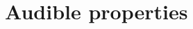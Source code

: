 \documentclass{amsart}
\begin{document}
\begin{comment}
Now suppose that $C$ is invertible (so that, in particular, $p_\lambda(0) \neq
	0$) and set $A = C^\inv$. Then the formula
\begin{equation}
	\label{eq:dlog}
	\frac{d}{d\lambda} \log \det (\id - \lambda C) = -\Tr R_\lambda (A)
\end{equation}
holds. When $R_\lambda(A)$ is an integral operator acting on some space $H =
	L^2(X)$ via an integral kernel $R_\lambda (x,y)$ on $X\times X$, the trace may be
computed via
\begin{equation}
	\label{eq:trace}
	\Tr R_\lambda (A) = \int_X R_\lambda (x,x) \dop x.
\end{equation}
\subsection{Storing spectral data}
Now let $M$ be a compact connected, Riemannian manifold without boundary. Let
$\Delta$ be the laplace-beltrami operator on $M$. Its resolvent
$R_\lambda(\Delta) = (\Delta - \lambda \id)^\inv$ is compact and self-adjoint. We
consider its characteristic determinant: [TODO bloviate]

We associate to each $M$ some generating functions. For $t>0$, the \textbf{heat
	trace} of $M$ is
\begin{equation}
	\label{eq:theta}
	\Theta_M(t) = \Tr (\exp(-t\Delta_M ) - \id ) = \sum_{\lambda \in \sigma(\Delta_M)} m_\lambda \exp (-t \lambda).
\end{equation}
For $s \in \Cbb$ the \textbf{resolvent determinant}
\begin{equation}
	\label{eq:zeta}
	Z_M(\lambda) = \det (1 - \lambda R_\Delta(-1))
\end{equation}


\begin{prop}
	Let $M$ and $M'$ be compact connected Riemannian manifolds without boundary.
	The following properties are equivalent
	\begin{enumerate}
		\item $M$ and $M'$ are isospectral
		\item $\Theta_M = \Theta_{M'}$ (as functions on $\Rbb_{>0}$)
		\item $Z_M = Z_{M'}$ (as functions on $\Cbb$).
	\end{enumerate}
\end{prop}
[TODO bloviate]
\end{comment}


\section{Audible properties}
\end{document}
